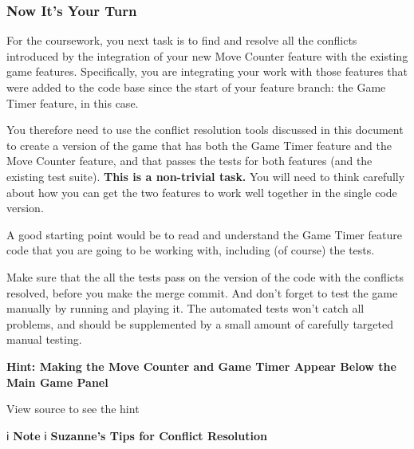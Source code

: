 \documentclass[
]{book}
\begin{document}
\hypertarget{yourturn}{%
\subsubsection{Now It's Your Turn}\label{yourturn}}

For the coursework, you next task is to find and resolve all the conflicts introduced by the integration of your new Move Counter feature with the existing game features. Specifically, you are integrating your work with those features that were added to the code base since the start of your feature branch: the Game Timer feature, in this case.

You therefore need to use the conflict resolution tools discussed in this document to create a version of the game that has both the Game Timer feature and the Move Counter feature, and that passes the tests for both features (and the existing test suite). \textbf{This is a non-trivial task.} You will need to think carefully about how you can get the two features to work well together in the single code version.

A good starting point would be to read and understand the Game Timer feature code that you are going to be working with, including (of course) the tests.

Make sure that the all the tests pass on the version of the code with the conflicts resolved, before you make the merge commit. And don't forget to test the game manually by running and playing it. The automated tests won't catch all problems, and should be supplemented by a small amount of carefully targeted manual testing.

\textbf{Hint: Making the Move Counter and Game Timer Appear Below the Main Game Panel}

View source to see the hint

ℹ️ \textbf{Note} ℹ️
\textbf{Suzanne's Tips for Conflict Resolution}
\end{document}
